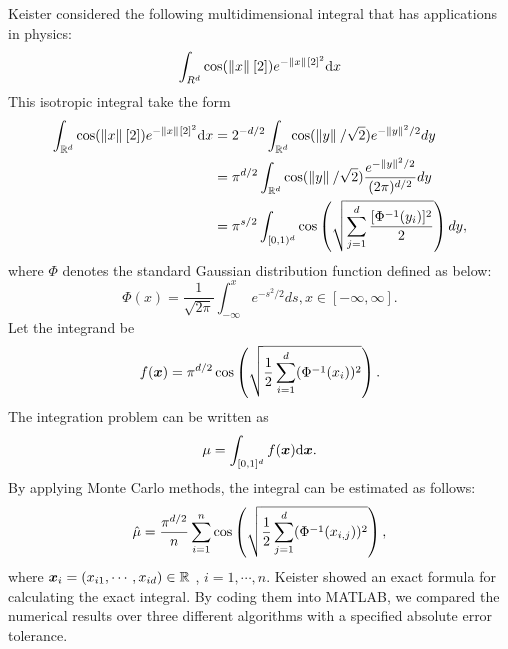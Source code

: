 \documentclass{iitthesis}
\theoremstyle{definition}
\begin{document}
\label{subsec:keitertestfunmeanMCg}
Keister \cite{Keister96} considered the following multidimensional integral that has applications in physics:
\begin{equation}\label{KeisterTestFun}
\int_{R^d} \cos (\left \lVert x \right \rVert_{{}}[2])e^{-\left \lVert x \right \rVert_{{}}[2]^2} {\rm d} x 
\end{equation}
This isotropic integral take the form
\begin{align*}
 \int_{\mathbb{R}^d} \cos (\left \lVert x \right \rVert_{{}}[2])e^{-\left \lVert x \right \rVert_{{}}[2]^2} {\rm d} x &= 2^{-d/2}\int_{\mathbb{R}^d} \cos(\left \lVert y \right \rVert_{{}}/\sqrt{2}) e^{-\left \lVert y \right \rVert_{{}}^2/2} dy \\
&= \pi^{d/2} \int_{\mathbb{R}^d} \cos(\left \lVert y \right \rVert_{{}}/\sqrt{2}) \frac{e^{-\left \lVert y \right \rVert_{{}}^2/2}}{(2\pi)^{d/2}} dy\\
 &= \pi^{s/2} \int_{[0,1)^d} \cos \left ( \sqrt{\sum_{j=1}^d \frac{[\Phi^{-1}(y_i)]^2}{2}}\right )dy,
\end{align*}
where $\Phi$ denotes the standard Gaussian distribution function defined as below:
$$\Phi(x) = \frac{1}{\sqrt{2\pi}} \int_{-\infty}^x e^{-s^2/2}ds, x \in [-\infty, \infty].$$
Let the integrand be 
\begin{equation*}
f(\boldsymbol{x}) = \pi^{d/2} \cos \left( \sqrt{\frac{1}{2} \sum_{i=1}^d (\Phi^{-1} (x_i))^2}\right).
\end{equation*}
The integration problem can be written as
\begin{equation*}
\mu = \int_{[0,1]^d} f(\boldsymbol{x}){\rm d}\boldsymbol{x}.
\end{equation*}
By applying Monte Carlo methods, the integral can be estimated as follows:
\begin{align}
\hat{\mu} = \frac{\pi^{d/2}}{n}\sum_{i=1}^n \cos \left (\sqrt{\frac12 \sum_{j=1}^d (\Phi^{-1}(x_{i,j}))^2}\right),
\end{align}
where $\boldsymbol{x}_i = (x_{i1},\cdots,x_{id}) \in \mathbb{R}$ , $i=1,\cdots, n.$
Keister \cite{Keister96} showed an exact formula for calculating the exact integral. By coding them into MATLAB, we compared the numerical results over three different algorithms with a specified absolute error tolerance.
\end{document}
